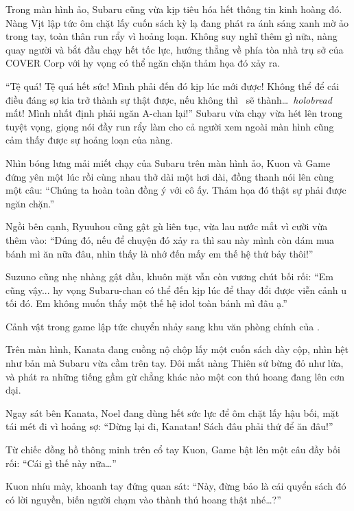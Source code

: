 \documentclass[../main.tex]{subfiles}
\begin{document}
Trong màn hình ảo, Subaru cũng vừa kịp tiêu hóa hết thông tin kinh hoàng đó. Nàng Vịt lập tức ôm chặt lấy cuốn sách kỳ lạ đang phát ra ánh sáng xanh mờ ảo trong tay, toàn thân run rẩy vì hoảng loạn. Không suy nghĩ thêm gì nữa, nàng quay người và bắt đầu chạy hết tốc lực, hướng thẳng về phía tòa nhà trụ sở của COVER Corp với hy vọng có thể ngăn chặn thảm họa đó xảy ra.

``Tệ quá! Tệ quá hết sức! Mình phải đến đó kịp lúc mới được! Không thể để cái điều đáng sợ kia trở thành sự thật được, nếu không thì \hll\ sẽ thành\dots\ \textit{holobread} mất! Mình nhất định phải ngăn A-chan lại!'' Subaru vừa chạy vừa hét lên trong tuyệt vọng, giọng nói đầy run rẩy làm cho cả người xem ngoài màn hình cũng cảm thấy được sự hoảng loạn của nàng.

Nhìn bóng lưng mải miết chạy của Subaru trên màn hình ảo, Kuon và Game đứng yên một lúc rồi cùng nhau thở dài một hơi dài, đồng thanh nói lên cùng một câu: ``Chúng ta hoàn toàn đồng ý với cô ấy. Thảm họa đó thật sự phải được ngăn chặn.''

Ngồi bên cạnh, Ryuuhou cũng gật gù liên tục, vừa lau nước mắt vì cười vừa thêm vào: ``Đúng đó, nếu để chuyện đó xảy ra thì sau này mình còn dám mua bánh mì ăn nữa đâu, nhìn thấy là nhớ đến mấy em thế hệ thứ bảy thôi!''

Suzuno cũng nhẹ nhàng gật đầu, khuôn mặt vẫn còn vương chút bối rối: ``Em cũng vậy... hy vọng Subaru-chan có thể đến kịp lúc để thay đổi được viễn cảnh u tối đó. Em không muốn thấy một thế hệ idol toàn bánh mì đâu ạ.''

\ct

Cảnh vật trong game lập tức chuyển nhảy sang khu văn phòng chính của \hll.

Trên màn hình, Kanata đang cuồng nộ chộp lấy một cuốn sách dày cộp, nhìn hệt như bản mà Subaru vừa cầm trên tay. Đôi mắt nàng Thiên sứ bừng đỏ như lửa, và phát ra những tiếng gầm gừ chẳng khác nào một con thú hoang đang lên cơn dại.


Ngay sát bên Kanata, Noel đang dùng hết sức lực để ôm chặt lấy hậu bối, mặt tái mét đi vì hoảng sợ: ``Dừng lại đi, Kanatan! Sách đâu phải thứ để ăn đâu!''

Từ chiếc đồng hồ thông minh trên cổ tay Kuon, Game bật lên một câu đầy bối rối: ``Cái gì thế này nữa\dots''

Kuon nhíu mày, khoanh tay đứng quan sát: ``Này, đừng bảo là cái quyển sách đó có lời nguyền, biến người chạm vào thành thú hoang thật nhé\dots?''
\end{document}
